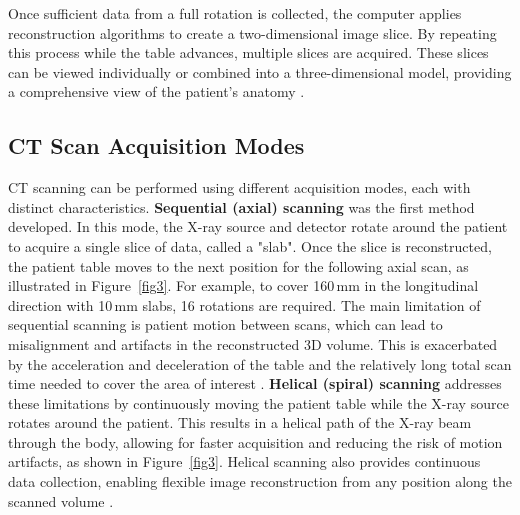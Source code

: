 \documentclass[12pt,a4paper]{article}
\begin{document}
Once sufficient data from a full rotation is collected, the computer applies reconstruction algorithms to create a two-dimensional image slice. By repeating this process while the table advances, multiple slices are acquired. These slices can be viewed individually or combined into a three-dimensional model, providing a comprehensive view of the patient’s anatomy \cite{nibib_ct}.



\subsection{CT Scan Acquisition Modes}
\label{ct_scan_modes}

CT scanning can be performed using different acquisition modes, each with distinct characteristics.
\newline\newline
\textbf{Sequential (axial) scanning} was the first method developed. In this mode, the X-ray source and detector rotate around the patient to acquire a single slice of data, called a "slab". Once the slice is reconstructed, the patient table moves to the next position for the following axial scan, as illustrated in Figure~\ref{fig3}. For example, to cover 160\,mm in the longitudinal direction with 10\,mm slabs, 16 rotations are required. The main limitation of sequential scanning is patient motion between scans, which can lead to misalignment and artifacts in the reconstructed 3D volume. This is exacerbated by the acceleration and deceleration of the table and the relatively long total scan time needed to cover the area of interest \cite{nett2019ctscanmodes}.
\newline\newline
\textbf{Helical (spiral) scanning} addresses these limitations by continuously moving the patient table while the X-ray source rotates around the patient. This results in a helical path of the X-ray beam through the body, allowing for faster acquisition and reducing the risk of motion artifacts, as shown in Figure~\ref{fig3}. Helical scanning also provides continuous data collection, enabling flexible image reconstruction from any position along the scanned volume \cite{nett2019ctscanmodes}.
\end{document}
